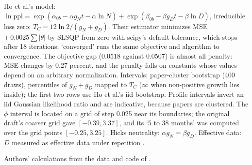 \begin{table}[tp]
\begin{tablenotes}
Ho et al.'s model: $\ln\text{ppl}=\exp(\alpha_{0b}-\alpha g_Nt-\alpha\ln N)+\exp(\beta_{0b}-\beta g_Dt-\beta\ln D)$, irreducible loss zero; $T_C=12\ln2/(g_N+g_D)$. Their estimator minimizes MSE $+\,0.0025\sum|\theta|$ by SLSQP from zero with scipy's default tolerance, which stops after 18 iterations; `converged' runs the same objective and algorithm to convergence. The objective gap (0.0518 against 0.0507) is almost all penalty: MSE changes by 0.27 percent, and the penalty falls on constants whose values depend on an arbitrary normalization. Intervals: paper-cluster bootstrap (400 draws), percentiles of $g_N+g_D$ mapped to $T_C$ ($\infty$ when non-positive growth lies inside); the first two rows use Ho et al.'s iid bootstrap. Profile intervals invert an iid Gaussian likelihood ratio and are indicative, because papers are clustered. The $\phi$ interval is located on a grid of step 0.025 near its boundaries; the original draft's coarser grid gave $[-0.39,3.37]$, and its `5 to 38 months' was computed over the grid points $[-0.25,3.25]$. Hicks neutrality: $\alpha g_N=\beta g_D$. Effective data: $D$ measured as effective data under repetition \citep{muennighoff2023scaling}.
\end{tablenotes}
\begin{tablenotes}[Source]
Authors' calculations from the data and code of \citet{ho2024algorithmic}.
\end{tablenotes}
\end{table}
